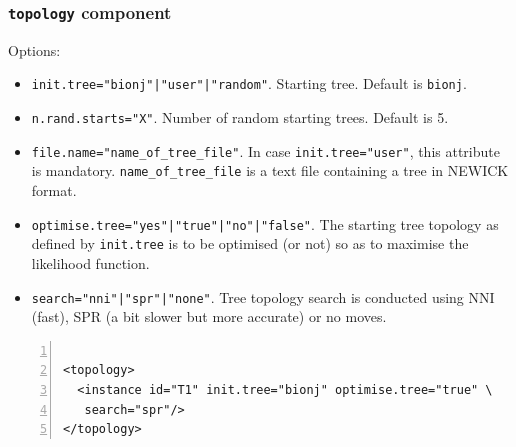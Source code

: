 \documentclass[a4paper,12pt]{article}
\newcommand{\x}[1]{\texttt{#1}}
\begin{document}
\subsubsection{{\tt topology} component}
Options:
\begin{itemize}
\item \x{init.tree="bionj"|"user"|"random"}.  Starting tree. Default is \x{bionj}.
\item \x{n.rand.starts="X"}.  Number of random starting trees. Default is 5.
\item \x{file.name="name\_of\_tree\_file"}. In case \x{init.tree="user"}, this
  attribute  is mandatory. \x{name\_of\_tree\_file} is a
  text file containing a tree in NEWICK format.
\item \x{optimise.tree="yes"|"true"|"no"|"false"}. The starting tree topology as defined by
  \x{init.tree} is to be optimised (or not) so as to maximise the likelihood function.
\item \x{search="nni"|"spr"|"none"}. Tree topology search is conducted using NNI (fast), SPR (a bit
  slower but more accurate) or no moves.
\end{itemize}
\vspace{0.2cm}
\begin{Verbatim}[frame=single, label=Example of `topology' component, samepage=true,
  baselinestretch=0.5, fontsize=\small, numbers=left]

<topology>
  <instance id="T1" init.tree="bionj" optimise.tree="true" \
   search="spr"/>
</topology>

\end{Verbatim}
\end{document}
